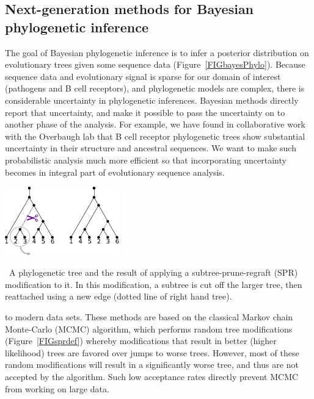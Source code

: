 \documentclass[nobib]{tufte-handout}
\begin{document}
\subsection{Next-generation methods for Bayesian phylogenetic inference}
\vspace{-0.3cm}
The goal of Bayesian phylogenetic inference is to infer a posterior distribution on evolutionary trees given some sequence data (Figure~\ref{FIGbayesPhylo}).
Because sequence data and evolutionary signal is sparse for our domain of interest (pathogens and B cell receptors), and phylogenetic models are complex, there is considerable uncertainty in phylogenetic inferences.
Bayesian methods directly report that uncertainty, and make it possible to pass the uncertainty on to another phase of the analysis.
For example, we have found in collaborative work with the Overbaugh lab \cite{Simonich2019-nn} that B cell receptor phylogenetic trees show substantial uncertainty in their structure and ancestral sequences.
We want to make such probabilistic analysis much more efficient so that incorporating uncertainty becomes in integral part of evolutionary sequence analysis.

\begin{marginfigure}[-0.in]%
  \includegraphics[width=1.95in]{spr-definition}
  \caption{\
    A phylogenetic tree and the result of applying a subtree-prune-regraft (SPR) modification to it.
    In this modification, a subtree is cut off the larger tree, then reattached using a new edge (dotted line of right hand tree).
    }
  \label{FIGsprdef}
\end{marginfigure}%

 to modern data sets.
These methods are based on the classical Markov chain Monte-Carlo (MCMC) algorithm, which performs random tree modifications (Figure~\ref{FIGsprdef}) whereby modifications that result in better (higher likelihood) trees are favored over jumps to worse trees.
However, most of these random modifications will result in a significantly worse tree, and thus are not accepted by the algorithm.
Such low acceptance rates directly prevent MCMC from working on large data.
\end{document}
